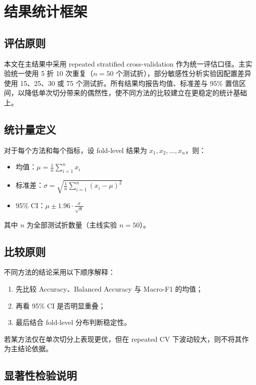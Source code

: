 \section{结果统计框架}

\subsection{评估原则}

本文在主结果中采用 repeated stratified cross-validation 作为统一评估口径。主实验统一使用 5 折 10 次重复（$n=50$ 个测试折），部分敏感性分析实验因配置差异使用 15、25、30 或 75 个测试折。所有结果均报告均值、标准差与 95\% 置信区间，以降低单次切分带来的偶然性，使不同方法的比较建立在更稳定的统计基础上。

\subsection{统计量定义}

对于每个方法和每个指标，设 fold-level 结果为 $x_1, x_2, \dots, x_n$，则：

\begin{itemize}
    \item 均值：$\mu = \frac{1}{n} \sum_{i=1}^{n} x_i$
    \item 标准差：$\sigma = \sqrt{\frac{1}{n} \sum_{i=1}^{n} (x_i - \mu)^2}$
    \item 95\% CI：$\mu \pm 1.96 \cdot \frac{\sigma}{\sqrt{n}}$
\end{itemize}

其中 $n$ 为全部测试折数量（主线实验 $n=50$）。

\subsection{比较原则}

不同方法的结论采用以下顺序解释：

\begin{enumerate}
    \item 先比较 Accuracy、Balanced Accuracy 与 Macro-F1 的均值；
    \item 再看 95\% CI 是否明显重叠；
    \item 最后结合 fold-level 分布判断稳定性。
\end{enumerate}

若某方法仅在单次切分上表现更优，但在 repeated CV 下波动较大，则不将其作为主结论依据。

\subsection{显著性检验说明}

